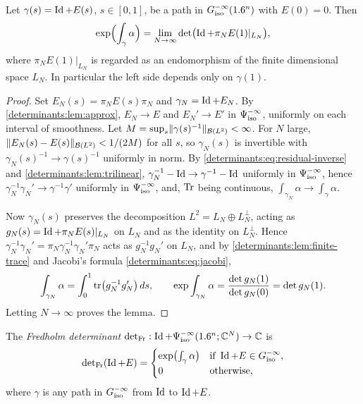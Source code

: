 \begin{lemma}\label{determinants:lem:path-limit}
  Let $\gamma(s)=\operatorname{Id}+E(s)$, $s\in[0,1]$, be a path in $G^{-\infty}_{\mathrm{iso}}(1.6^n)$
  with $E(0)=0$. Then
  \begin{equation*}
    \exp\Bigl(\int_\gamma\alpha\Bigr)=\lim_{N\to\infty}
    \det\bigl(\operatorname{Id}+\pi_NE(1)|_{L_N}\bigr),
  \end{equation*}
  where $\pi_NE(1)|_{L_N}$ is regarded as an endomorphism of the finite
  dimensional space $L_N$. In particular the left side depends only on
  $\gamma(1)$.
\end{lemma}
\begin{proof}
  Set $E_N(s)=\pi_NE(s)\pi_N$ and $\gamma_N=\operatorname{Id}+E_N$. By
  \cref{determinants:lem:approx}, $E_N\to E$ and $E_N'\to E'$ in
  $\Psi^{-\infty}_{\mathrm{iso}}$, uniformly on each interval of smoothness. Let
  $M=\sup_s\lVert \gamma(s)^{-1}\rVert_{\mathcal{B}(L^2)}<\infty$. For $N$ large,
  $\lVert E_N(s)-E(s)\rVert_{\mathcal{B}(L^2)}<1/(2M)$ for all $s$, so $\gamma_N(s)$ is
  invertible with $\gamma_N(s)^{-1}\to\gamma(s)^{-1}$ uniformly in norm. By
  \eqref{determinants:eq:residual-inverse} and
  \cref{determinants:lem:trilinear}, $\gamma_N^{-1}-\operatorname{Id}\to\gamma^{-1}-\operatorname{Id}$
  uniformly in $\Psi^{-\infty}_{\mathrm{iso}}$, hence
  $\gamma_N^{-1}\gamma_N'\to\gamma^{-1}\gamma'$ uniformly in
  $\Psi^{-\infty}_{\mathrm{iso}}$, and, $\operatorname{Tr}$ being continuous,
  $\int_{\gamma_N}\alpha\to\int_\gamma\alpha$.

  Now $\gamma_N(s)$ preserves the decomposition $L^2=L_N\oplus L_N^\perp$,
  acting as $g_N(s)=\operatorname{Id}+\pi_NE(s)|_{L_N}$ on $L_N$ and as the identity on
  $L_N^\perp$. Hence $\gamma_N^{-1}\gamma_N'=\pi_N\gamma_N^{-1}\gamma_N'\pi_N$
  acts as $g_N^{-1}g_N'$ on $L_N$, and by
  \cref{determinants:lem:finite-trace} and Jacobi's formula
  \eqref{determinants:eq:jacobi},
  \begin{equation*}
    \int_{\gamma_N}\alpha=\int_0^1\operatorname{tr}\bigl(g_N^{-1}g_N'\bigr)\,ds,\qquad
    \exp\int_{\gamma_N}\alpha=\frac{\det g_N(1)}{\det g_N(0)}=\det g_N(1).
  \end{equation*}
  Letting $N\to\infty$ proves the lemma.
\end{proof}

\begin{definition}\label{determinants:def:det}
  The \emph{Fredholm determinant} $\operatorname{det}_{\mathrm{Fr}}:\operatorname{Id}+\Psi^{-\infty}_{\mathrm{iso}}(1.6^n;\mathbb{C}^N)\to\mathbb{C}$ is
  \begin{equation*}
    \operatorname{det}_{\mathrm{Fr}}(\operatorname{Id}+E)=\begin{cases}
      \exp\bigl(\int_\gamma\alpha\bigr) & \text{if }\operatorname{Id}+E\in G^{-\infty}_{\mathrm{iso}},\\
      0&\text{otherwise,}
    \end{cases}
  \end{equation*}
  where $\gamma$ is any path in $G^{-\infty}_{\mathrm{iso}}$ from $\operatorname{Id}$ to $\operatorname{Id}+E$.
\end{definition}

